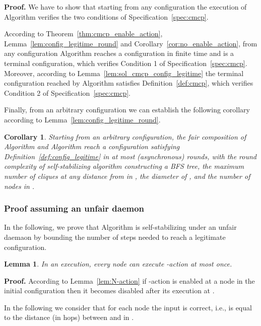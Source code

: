 \documentclass[11pt,letterpaper,onecolumn]{article}
\newtheorem{corollary}{Corollary}
\newtheorem{lemma}{Lemma}
\newenvironment{proof}{\noindent \begin{rm}{\textbf{Proof.} }}{\hspace*{\fill}\par\end{rm} \vspace{.3cm}}
\begin{document}
\begin{proof}
We have to show that starting from any configuration the execution of Algorithm  verifies the two conditions of Specification~\ref{spec:cmcp}.

According to Theorem~\ref{thm:cmcp_enable_action}, Lemma~\ref{lem:config_legitime_round} and Corollary~\ref{cor:no_enable_action}, from any configuration Algorithm  reaches a configuration  in finite time and  is a terminal configuration, which verifies Condition 1 of Specification~\ref{spec:cmcp}. Moreover, according to Lemma~\ref{lem:sol_cmcp_config_legitime} the terminal configuration  reached by Algorithm  satisfies Definition~\ref{def:cmcp}, which verifies Condition 2 of Specification~\ref{spec:cmcp}.
\end{proof}

Finally, from an arbitrary configuration we can establish the following corollary according to Lemma~\ref{lem:config_legitime_round}.

\begin{corollary}
\label{cor:config_legitime_round_avec_BFS}
Starting from an arbitrary configuration, the fair composition of Algorithm  and Algorithm  reach a configuration satisfying Definition~\ref{def:config_legitime} in at most  (asynchronous) rounds, with  the round complexity of self-stabilizing algorithm  constructing a BFS tree,  the maximum number of cliques at any distance from  in ,  the diameter of , and  the number of nodes in .
\end{corollary}

\subsubsection{Proof assuming an unfair daemon}

In the following, we prove that Algorithm  is self-stabilizing under an unfair daemaon by bounding the number of steps needed to reach a legitimate configuration.

\begin{lemma}
\label{lem:N-action_steps}
In an execution, every node  can execute -action at most once.
\end{lemma}

\begin{proof}
According to Lemma~\ref{lem:N-action} if -action is enabled at a node  in the initial configuration then it becomes disabled after its execution at .
\end{proof}

In the following we consider that for each node  the input  is correct, i.e.,  is equal to the distance (in hops) between  and  in .
\end{document}
